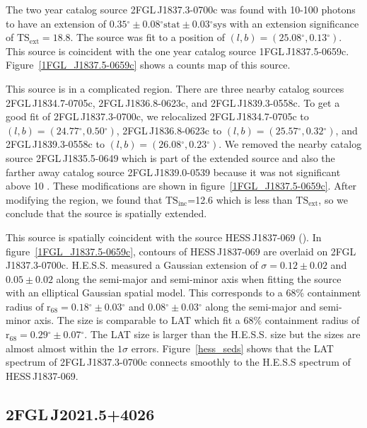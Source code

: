 \documentclass[12pt,preprint]{aastex}
\newcommand{\gev}{\text{GeV}\xspace}
\newcommand{\tev}{\text{TeV}\xspace}
\newcommand{\tsext}{{\ensuremath{\text{TS}_{\text{ext}}}}\xspace}
\newcommand{\tsinc}{\ensuremath{\text{TS}_{\text{inc}}}\xspace}
\newcommand{\rsixeight}{{\ensuremath{\text{r}_{68}}}\xspace}
\newcommand{\sys}{\text{sys}\xspace}
\newcommand{\stat}{\text{stat}\xspace}
\renewcommand{\deg}{\ensuremath{^\circ}\xspace}
\begin{document}
The two year catalog source 2FGL\,J1837.3-0700c was found 
with 10-100 \gev photons 
to have an extension
of $0.35\deg\pm0.08\deg\stat\pm0.03\deg\sys$ 
with an extension
significance of $\tsext=18.8$.  The source was fit to a position of
$(l,b)=(25.08\deg,0.13\deg)$.  This source is coincident with the one
year catalog source 1FGL\,J1837.5-0659c.  Figure~\ref{1FGL_J1837.5-0659c}
shows a counts map of this source.

This source is in a complicated region. There are three nearby
catalog sources 2FGL\,J1834.7-0705c, 2FGL\,J1836.8-0623c, and
2FGL\,J1839.3-0558c.  To get a good fit of 2FGL\,J1837.3-0700c, we
relocalized 2FGL\,J1834.7-0705c to $(l,b)=(24.77\deg,0.50\deg)$,
2FGL\,J1836.8-0623c to $(l,b)=(25.57\deg,0.32\deg)$, and
2FGL\,J1839.3-0558c to $(l,b)=(26.08\deg,0.23\deg)$.  We removed the
nearby catalog source 2FGL\,J1835.5-0649 which is part of the extended
source and also the farther away catalog source 2FGL\,J1839.0-0539
because it was not significant above 10 \gev. These modifications are
shown in figure~\ref{1FGL_J1837.5-0659c}.  After modifying the region,
we found that \tsinc=12.6 which is less than \tsext, so we conclude that
the source is spatially extended.

This source is spatially coincident with the \tev
source HESS\,J1837-069 (\cite{hess_plane_survey}).  In
figure~\ref{1FGL_J1837.5-0659c}, contours of HESS\,J1837-069
are overlaid on 2FGL\,J1837.3-0700c. H.E.S.S. measured a 
Gaussian extension
of $\sigma=0.12\pm0.02$ and $0.05\pm0.02$ along the semi-major and
semi-minor axis when fitting the source with an elliptical Gaussian
spatial model.  This corresponds to a 68\% containment radius of
$\rsixeight=0.18\deg\pm0.03\deg$ and $0.08\deg\pm0.03\deg$ along the semi-major
and semi-minor axis. The size is comparable to LAT which fit a 68\%
containment radius of $\rsixeight=0.29\deg\pm0.07\deg$.  The LAT size is larger
than the H.E.S.S. size but the sizes are almost almost within the
$1\sigma$ errors. Figure~\ref{hess_seds} shows that the LAT spectrum
of 2FGL\,J1837.3-0700c connects smoothly to the H.E.S.S spectrum of
HESS\,J1837-069.




\subsection{2FGL\,J2021.5+4026}
\label{section_2FGL J2021.5+4026}
\end{document}
